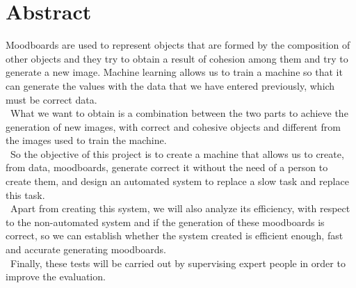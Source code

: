 \documentclass[12pt,a4paper,openright,oneside]{article}
\numberwithin{equation}{section}
\theoremstyle{definition}
\begin{document}
\newpage
{} 

\section*{Abstract}

Moodboards are used to represent objects that are formed by the composition of other objects and they try to obtain a result of cohesion among them and try to generate a new image.
Machine learning allows us to train a machine so that it can generate the values with the data that we have entered previously, which must be correct data.
\\\
What we want to obtain is a combination between the two parts to achieve the generation of new images, with correct and cohesive objects and different from the images used to train the machine.
\\\
So the objective of this project is to create a machine that allows us to create, from data, moodboards, generate correct it without the need of a person to create them, and design an automated system to replace a slow task and replace this task.
\\\
Apart from creating this system, we will also analyze its efficiency, with respect to the non-automated system and if the generation of these moodboards is correct, so we can establish whether the system created is efficient enough, fast and accurate generating moodboards.
\\\
Finally, these tests will be carried out by supervising expert people in order to improve the evaluation.
\end{document}
